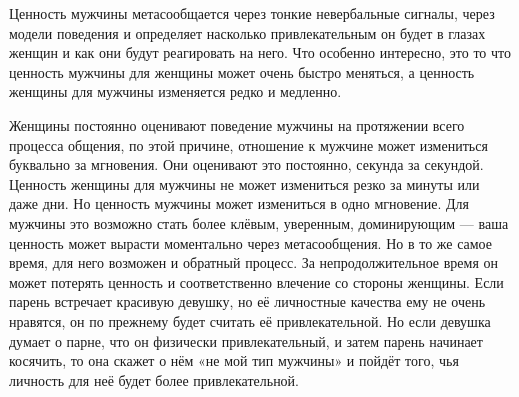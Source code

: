 \RULE  Ценность мужчины метасообщается через тонкие невербальные сигналы, через модели поведения и определяет насколько привлекательным он будет в глазах женщин и как они будут реагировать на него. Что особенно интересно, это то что ценность мужчины для женщины может очень быстро меняться, а ценность женщины для мужчины изменяется редко и медленно.

\RULE  Женщины постоянно оценивают поведение мужчины на протяжении всего процесса общения, по этой причине, отношение к мужчине может измениться буквально за мгновения. Они оценивают это постоянно, секунда за секундой. Ценность женщины для мужчины не может измениться резко за минуты или даже дни. Но ценность мужчины может измениться в одно мгновение. Для мужчины это возможно стать более клёвым, уверенным, доминирующим --- ваша ценность может вырасти моментально через метасообщения. Но в то же самое время, для него возможен и обратный процесс. За непродолжительное время он может потерять ценность и соответственно влечение со стороны женщины. Если парень встречает красивую девушку, но её личностные качества ему не очень нравятся, он по прежнему будет считать её привлекательной. Но если девушка думает о парне, что он физически привлекательный, и затем парень начинает косячить, то она скажет о нём «не мой тип мужчины» и пойдёт того, чья личность для неё будет более привлекательной.

